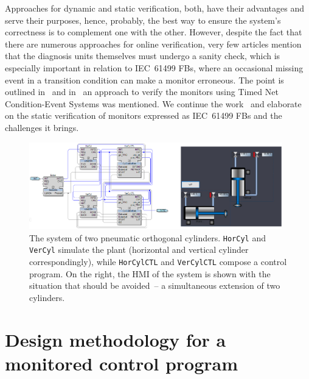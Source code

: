 \documentclass[conference]{IEEEtran}
\begin{document}
Approaches for dynamic and static verification, both, have their advantages and serve their purposes, hence, probably, the best way to ensure the system's correctness is to complement one with the other. However, despite the fact that there are numerous approaches for online verification, very few articles mention that the diagnosis units themselves must undergo a sanity check, which is especially important in relation to IEC~61499 FBs, where an occasional missing event in a transition condition can make a monitor erroneous. The point is outlined in~\cite{9wiesmayr2022supporting} and in~\cite{17jhunjhunwala2022monitoring} an approach to verify the monitors using Timed Net Condition-Event Systems was mentioned. We continue the work~\cite{17jhunjhunwala2022monitoring} and elaborate on the static verification of monitors expressed as IEC~61499 FBs and the challenges it brings. 
 
\begin{figure}[htb]
    \centering
    \includegraphics[width=0.98\textwidth]{pic/wholesystem_withhmi.png}
    \caption{The system of two pneumatic orthogonal cylinders. \texttt{HorCyl} and \texttt{VerCyl} simulate the plant (horizontal and vertical cylinder correspondingly), while \texttt{HorCylCTL} and \texttt{VerCylCTL} compose a control program. On the right, the HMI of the system is shown with the situation that should be avoided~-- a simultaneous extension of two cylinders.}
    \label{system}
\end{figure}

\section{Design methodology for a monitored control program}
\label{sec:method}
\end{document}
